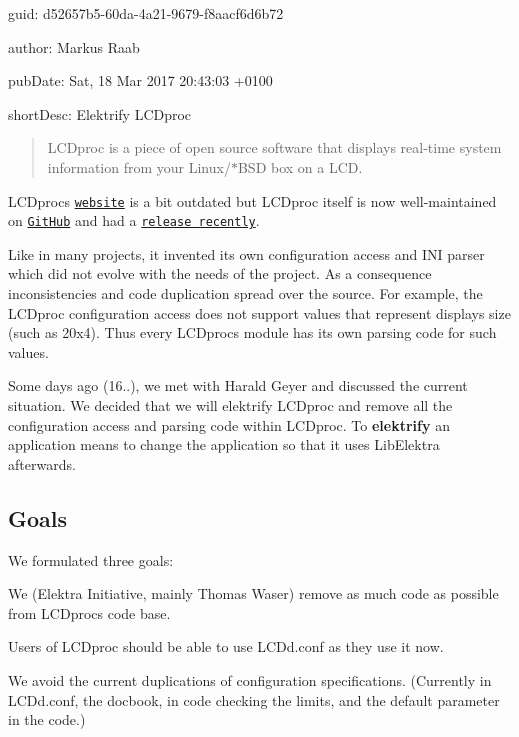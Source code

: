 
\begin{DoxyItemize}
\item guid\+: d52657b5-\/60da-\/4a21-\/9679-\/f8aacf6d6b72
\item author\+: Markus Raab
\item pub\+Date\+: Sat, 18 Mar 2017 20\+:43\+:03 +0100
\item short\+Desc\+: Elektrify L\+C\+Dproc
\end{DoxyItemize}

\begin{quote}
L\+C\+Dproc is a piece of open source software that displays real-\/time system information from your Linux/$\ast$\+B\+SD box on a L\+CD. \end{quote}


L\+C\+Dproc\textquotesingle{}s \href{http://lcdproc.omnipotent.net/}{\tt website} is a bit outdated but L\+C\+Dproc itself is now well-\/maintained on \href{https://github.com/lcdproc/lcdproc}{\tt Git\+Hub} and had a \href{https://github.com/lcdproc/lcdproc/releases}{\tt release recently}.

Like in many projects, it invented its own configuration access and I\+NI parser which did not evolve with the needs of the project. As a consequence inconsistencies and code duplication spread over the source. For example, the L\+C\+Dproc configuration access does not support values that represent display\textquotesingle{}s size (such as {\ttfamily 20x4}). Thus every L\+C\+Dproc\textquotesingle{}s module has its own parsing code for such values.

Some days ago (16..), we met with Harald Geyer and discussed the current situation. We decided that we will elektrify L\+C\+Dproc and remove all the configuration access and parsing code within L\+C\+Dproc. To {\bfseries elektrify} an application means to change the application so that it uses Lib\+Elektra afterwards.

\subsection*{Goals}

We formulated three goals\+:


\begin{DoxyEnumerate}
\item We (Elektra Initiative, mainly Thomas Waser) remove as much code as possible from L\+C\+Dproc\textquotesingle{}s code base.
\item Users of L\+C\+Dproc should be able to use {\ttfamily L\+C\+Dd.\+conf} as they use it now.
\item We avoid the current duplications of configuration specifications. (Currently in {\ttfamily L\+C\+Dd.\+conf}, the docbook, in code checking the limits, and the default parameter in the code.)
\end{DoxyEnumerate}

